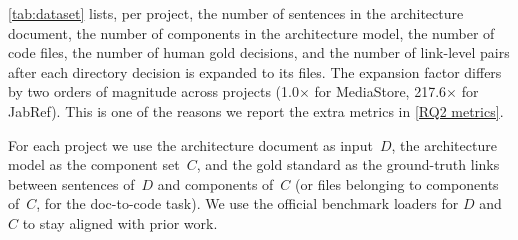 

\autoref{tab:dataset} lists, per project, the number of sentences in the architecture document, the number of components in the architecture model, the number of code files, the number of human gold decisions, and the number of link-level pairs after each directory decision is expanded to its files.
The expansion factor differs by two orders of magnitude across projects (1.0$\times$ for MediaStore, 217.6$\times$ for JabRef).
This is one of the reasons we report the extra metrics in \ref{RQ2 metrics}.

For each project we use the architecture document as input~$D$, the architecture model as the component set~$C$, and the gold standard as the ground-truth links between sentences of~$D$ and components of~$C$ (or files belonging to components of~$C$, for the doc-to-code task).
We use the official benchmark loaders for $D$ and $C$ to stay aligned with prior work.